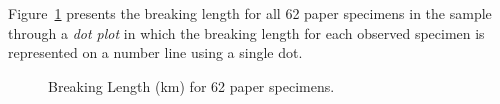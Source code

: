 \documentclass[
  letterpaper,
  DIV=11,
  numbers=noendperiod]{scrreprt}
\theoremstyle{plain}
\theoremstyle{definition}
\theoremstyle{definition}
\theoremstyle{remark}
\begin{document}
\begin{table}

\caption{\label{tbl-summaries-paper-table}Breaking length (km) for first
5 specimens in the Paper Strength study.}


\end{table}%

Figure~\ref{fig-summaries-paper-dotplot} presents the breaking length
for all 62 paper specimens in the sample through a \emph{dot plot} in
which the breaking length for each observed specimen is represented on a
number line using a single dot.

\begin{figure}


\caption{\label{fig-summaries-paper-dotplot}Breaking Length (km) for 62
paper specimens.}

\end{figure}%
\end{document}
